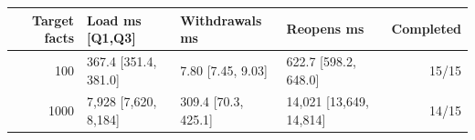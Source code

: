 \begin{tabular}{rlllr}
\toprule
Target facts & Load ms [Q1,Q3] & Withdrawals ms & Reopens ms & Completed \\
\midrule
100 & 367.4 [351.4, 381.0] & 7.80 [7.45, 9.03] & 622.7 [598.2, 648.0] & 15/15 \\
1000 & 7,928 [7,620, 8,184] & 309.4 [70.3, 425.1] & 14,021 [13,649, 14,814] & 14/15 \\
\bottomrule
\end{tabular}
